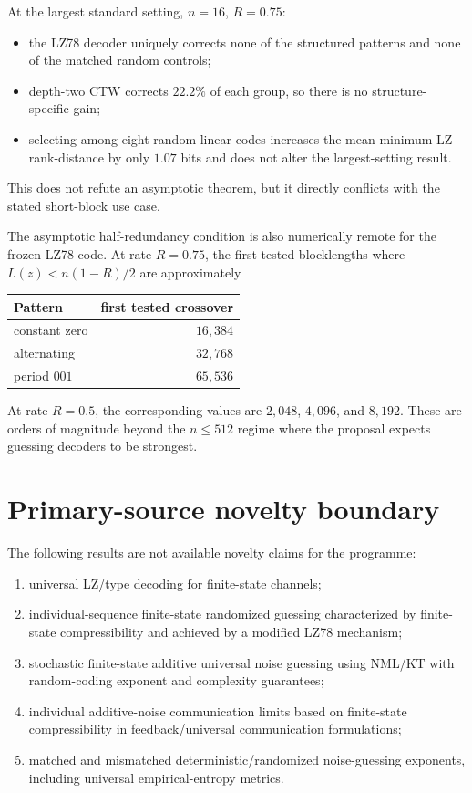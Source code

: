 \documentclass[11pt]{article}
\begin{document}
At the largest standard setting, $n=16$, $R=0.75$:
\begin{itemize}
  \item the LZ78 decoder uniquely corrects none of the structured patterns and none of the matched random controls;
  \item depth-two CTW corrects $22.2\%$ of each group, so there is no structure-specific gain;
  \item selecting among eight random linear codes increases the mean minimum LZ rank-distance by only $1.07$ bits and does not alter the largest-setting result.
\end{itemize}
This does not refute an asymptotic theorem, but it directly conflicts with the stated short-block use case.

The asymptotic half-redundancy condition is also numerically remote for the frozen LZ78 code.  At rate $R=0.75$, the first tested blocklengths where $L(z)<n(1-R)/2$ are approximately
\begin{center}
\begin{tabular}{@{}lr@{}}
\toprule
Pattern & first tested crossover \\
\midrule
constant zero & $16{,}384$ \\
alternating & $32{,}768$ \\
period $001$ & $65{,}536$ \\
\bottomrule
\end{tabular}
\end{center}
At rate $R=0.5$, the corresponding values are $2{,}048$, $4{,}096$, and $8{,}192$.  These are orders of magnitude beyond the $n\le512$ regime where the proposal expects guessing decoders to be strongest.

\section{Primary-source novelty boundary}

The following results are not available novelty claims for the programme:
\begin{enumerate}
  \item universal LZ/type decoding for finite-state channels;
  \item individual-sequence finite-state randomized guessing characterized by finite-state compressibility and achieved by a modified LZ78 mechanism;
  \item stochastic finite-state additive universal noise guessing using NML/KT with random-coding exponent and complexity guarantees;
  \item individual additive-noise communication limits based on finite-state compressibility in feedback/universal communication formulations;
  \item matched and mismatched deterministic/randomized noise-guessing exponents, including universal empirical-entropy metrics.
\end{enumerate}
\end{document}
